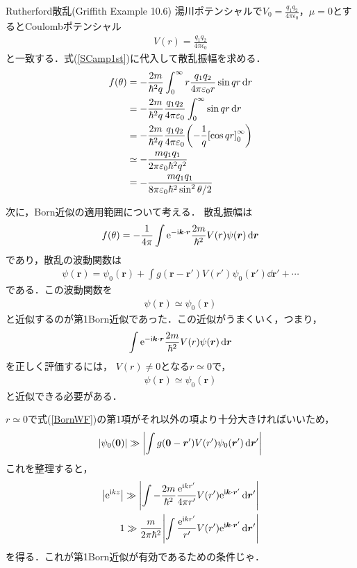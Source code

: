 \documentclass{report}
\begin{document}
\begin{myex}{Rutherford散乱(Griffith Example 10.6)}{}
  湯川ポテンシャルで$V_0 = \frac{q_1q_2}{4\pi \epsilon_0}$，$\mu = 0$とするとCoulombポテンシャル
  \begin{align}
    V(r) = \frac{q_1q_2}{4\pi\epsilon_0}
  \end{align}
  と一致する．式(\ref{SCamp1st})に代入して散乱振幅を求める．
  \begin{align}
    f(\theta) &= - \frac{2m}{\hbar^2q} \int_{0}^{\infty} r \frac{q_1q_2}{4\pi\varepsilon_0 r} \sin qr \dd{r}\\
    &= -\frac{2m}{\hbar^2q}\frac{q_1q_2}{4\pi\varepsilon_0}\int_{0}^{\infty} \sin qr \dd{r} \\
    &=  -\frac{2m}{\hbar^2q}\frac{q_1q_2}{4\pi\varepsilon_0}\qty(-\frac{1}{q}\qty[\cos qr]_0^{\infty})\\
    &\simeq - \frac{mq_1q_1}{2\pi\varepsilon_0\hbar^2q^2}\\
    &= - \frac{mq_1q_1}{8\pi\varepsilon_0\hbar^2 \sin^2 \theta/2}
  \end{align}
\end{myex}


 次に，Born近似の適用範囲について考える．
 散乱振幅は
 \begin{align}
  f(\theta) = -\frac{1}{4\pi} \int \mathrm{e}^{-\mathrm{i} \bm{k}\cdot \bm{r}} \frac{2m}{\hbar^2}V(r)\psi(\bm{r})\dd{\bm{r}}
 \end{align}
 であり，散乱の波動関数は
 \begin{align}
  \label{BornWF}
  \psi(\bm{r}) = \psi_0(\bm{r}) + \int g(\bm{r} - \bm{r'}) V(r') \psi_0(\bm{r'}) \dd{\bm{r'}} + \cdots
 \end{align}
 である．この波動関数を
 \begin{align}
  \psi(\bm{r}) \simeq \psi_0(\bm{r})
 \end{align}
 と近似するのが第1Born近似であった．この近似がうまくいく，つまり，
 \begin{align}
  \int \mathrm{e}^{-\mathrm{i} \bm{k}\cdot \bm{r}} \frac{2m}{\hbar^2}V(r)\psi(\bm{r})\dd{\bm{r}}
 \end{align}
 を正しく評価するには，
 $V(r) \neq 0$となる$r\simeq 0$で，
 \begin{align}
  \psi(\bm{r}) \simeq \psi_0(\bm{r})
 \end{align}
 と近似できる必要がある．

 $r \simeq 0$で式(\ref{BornWF})の第1項がそれ以外の項より十分大きければいいため，
 \begin{align}
  \abs{\psi_0(\bm{0})} \gg \abs{\int g(\bm{0} - \bm{r}') V(r') \psi_0(\bm{r}') \dd{\bm{r}'}}
 \end{align}
 これを整理すると，
 \begin{align}
  \abs{\mathrm{e}^{\mathrm{i} kz}} \gg \abs{\int -\frac{2m}{\hbar^2}\frac{\mathrm{e}^{\mathrm{i} kr'}}{4\pi r'}V(r') \mathrm{e}^{\mathrm{i} \bm{k}\cdot\bm{r}'}\dd{\bm{r}'}}\\
  1 \gg \frac{m}{2\pi \hbar^2}\abs{\int \frac{\mathrm{e}^{\mathrm{i} kr'}}{r'}V(r')\mathrm{e}^{\mathrm{i}\bm{k}\cdot\bm{r}'}\dd{\bm{r}'}}
  \label{BornCondition}
 \end{align}
 を得る．これが第1Born近似が有効であるための条件じゃ．
\end{document}
